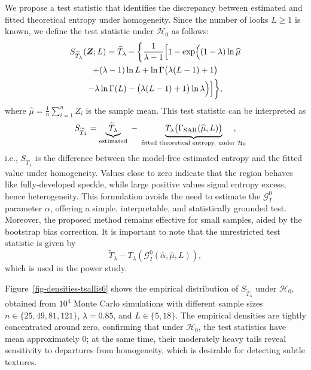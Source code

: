\documentclass[
  lettersize  journal,
]{IEEEtran}%
\begin{document}
We propose a test statistic that identifies the discrepancy between
estimated and fitted theoretical entropy under homogeneity. Since the
number of looks \(L\geq1\) is known, we define the test statistic under
\(\mathcal{H}_0\) as follows: \begin{multline}
\label{eq-test-tsallis}
S_{\widetilde{T}_{\lambda}}(\bm{Z}; L) = \widetilde{T}_{\lambda} - \biggl\{ \frac{1}{\lambda - 1} \Bigl[ 1 -
\exp\Bigl(
(1 - \lambda)\ln \widehat{\mu}\\
+ (\lambda - 1)\ln L
+ \ln\Gamma\bigl(\lambda(L - 1) + 1\bigr) \\
- \lambda\ln\Gamma(L)
- \bigl(\lambda(L - 1) + 1\bigr)\ln \lambda
\Bigr) \Bigr] \biggr\},
\end{multline} where \(\widehat{\mu} = \frac{1}{n} \sum_{i=1}^n Z_i\) is
the sample mean. This test statistic can be interpreted as \[
S_{\widetilde T_\lambda} 
= 
\underbrace{\widetilde T_\lambda}_{\text{estimated}} 
\;-\;
\underbrace{T_\lambda\bigl(\Gamma_{\mathrm{SAR}}(\widehat{\mu},L)\bigr)}_{\text{fitted theoretical entropy,  under } \mathcal{H}_0}\hspace{-1.5em},
\] i.e., \(S_{\widetilde T_\lambda}\) is the difference between the
model-free estimated entropy and the fitted value under homogeneity.
Values close to zero indicate that the region behaves like
fully-developed speckle, while large positive values signal entropy
excess, hence heterogeneity. This formulation avoids the need to
estimate the \(\mathcal{G}^0_I\) parameter \(\alpha\), offering a
simple, interpretable, and statistically grounded test. Moreover, the
proposed method remains effective for small samples, aided by the
bootstrap bias correction. It is important to note that the unrestricted
test statistic is given by \[
\widetilde{T}_\lambda - T_\lambda(\mathcal{G}^0_I(\widehat{\alpha}, \widehat{\mu}, L)),
\] which is used in the power study.

Figure~\ref{fig-densities-tsallis6} shows the empirical distribution of
\(S_{\widetilde{T}_{\lambda}}\) under \(\mathcal{H}_0\), obtained from
\(10^4\) Monte Carlo simulations with different sample sizes
\(n \in \{25, 49, 81,121\}\), \(\lambda = 0.85\), and
\(L \in \{5,18\}\). The empirical densities are tightly concentrated
around zero, confirming that under \(\mathcal{H}_0\), the test
statistics have mean approximately \(0\); at the same time, their
moderately heavy tails reveal sensitivity to departures from
homogeneity, which is desirable for detecting subtle textures.
\end{document}
